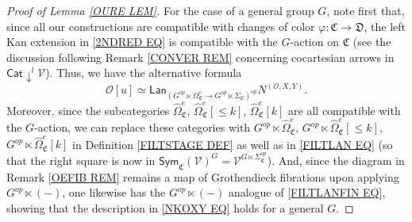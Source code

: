 \documentclass[a4paper,10pt
]{article}%
\numberwithin{equation}{section}
\numberwithin{figure}{section}
\theoremstyle{definition} %
\newcommand{\V}{\ensuremath{\mathcal V}}
\renewcommand{\O}{\ensuremath{\mathcal O}}
\newcommand{\1}{\ensuremath{\mathbbm 1}}%
\begin{document}
\begin{proof}[Proof of Lemma \ref{OURE LEM}]
	For the case of a general group $G$,
	note first that, since all our constructions 
	are compatible with changes of color
	$\varphi \colon \mathfrak{C} \to \mathfrak{D}$,
	the left Kan extension in \eqref{2NDRED EQ}
	is compatible with the $G$-action on $\mathfrak{C}$
	(see the discussion following Remark \ref{CONVER REM}
	concerning cocartesian arrows in $\mathsf{Cat} \downarrow^l \V$).
	Thus, we have the alternative formula
	\begin{equation}\label{3RDRED EQ}
	\O[u] \simeq
	\mathsf{Lan}_{\left(G^{op} \ltimes \Omega_{\mathfrak C}^{e} 
		\to
		G^{op} \ltimes \Sigma_{\mathfrak C}\right)^{op}} N^{(\O,X,Y)}.
	\end{equation}
%	
	Moreover, since the subcategories 
	$\widehat{\Omega}_{\mathfrak{C}}^e$,
	$\widehat{\Omega}_{\mathfrak{C}}^e[\leq k]$,
	$\widehat{\Omega}_{\mathfrak{C}}^e[k]$
	are all compatible with the $G$-action, we can replace these categories with 
	$G^{op} \ltimes \widehat{\Omega}_{\mathfrak{C}}^e$,
	$G^{op} \ltimes \widehat{\Omega}_{\mathfrak{C}}^e[\leq k]$,
	$G^{op} \ltimes \widehat{\Omega}_{\mathfrak{C}}^e[k]$
	in Definition \ref{FILTSTAGE DEF}
	as well as in \eqref{FILTLAN EQ}
	(so that the right square is now in 
	$\mathsf{Sym}_{\mathfrak{C}}(\mathcal{V})^G = \V^{G \ltimes \Sigma^{op}_{\mathfrak{C}}}$).
	And, since the diagram in Remark \ref{OEFIB REM}
	remains a map of Grothendieck fibrations 
	upon applying $G^{op} \ltimes (-)$,
	one likewise has the $G^{op} \ltimes (-)$ analogue of
	\eqref{FILTLANFIN EQ},
	showing that the description in 
	\eqref{NKOXY EQ} holds for a general $G$.
\end{proof}
\end{document}
